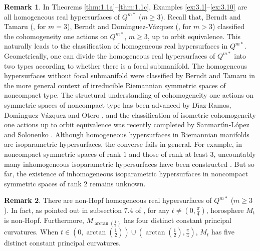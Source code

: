 \documentclass[reqno]{amsart}%
\theoremstyle{definition}
\newtheorem{remark}{Remark}[section]
\numberwithin{equation}{section}
\begin{document}
\begin{remark}\label{rem:1.1}
In Theorems \ref{thm:1.1a}--\ref{thm:1.1c}, Examples \ref{ex:3.1}--\ref{ex:3.10} are all homogeneous real hypersurfaces of $Q^{m*}$ ($m\geq3$). Recall that,
Berndt and Tamaru (\cite{BT2}, for $m=3$), Berndt and Dom\'{\i}nguez-V\'{a}zquez (\cite{BD1}, for $m>3$) classified the cohomogeneity one actions on 
$Q^{m*}$, $m\geq3$, up to orbit equivalence. This naturally leads to the classification of homogeneous real hypersurfaces in $Q^{m*}$. Geometrically,
one can divide the homogeneous real hypersurfaces of $Q^{m*}$ into two types
according to whether there is a focal submanifold. The homogeneous hypersurfaces without focal submanifold were classified by Berndt and Tamaru \cite{BT1} in the more general context of irreducible Riemannian symmetric
spaces of noncompact type. The structural understanding of 
cohomogeneity one actions on symmetric spaces of noncompact type 
has been advanced by D\'{\i}az-Ramos, Dom\'{\i}nguez-V\'{a}zquez and Otero \cite{DDO}, and the classification of isometric cohomogeneity one actions up to orbit equivalence was recently completed by Sanmart\'{\i}n-L\'{o}pez and Solonenko \cite{SS}. Although homogeneous hypersurfaces in Riemannian manifolds are isoparametric hypersurfaces, the converse fails in general. For example, in noncompact symmetric spaces of rank $1$ and those of rank at least $3$,
uncountably many inhomogeneous isoparametric hypersurfaces have been constructed \cite{DD2,DDR,DS}. But so far, the existence of 
inhomogeneous isoparametric hypersurfaces in noncompact symmetric spaces of rank $2$ remains unknown. 
\end{remark}

\begin{remark}\label{rem:1.1aaa}
There are non-Hopf homogeneous real hypersurfaces of $Q^{m*}$ ($m\geq3$).
In fact, as pointed out in subsection 7.4 of \cite{BS-2022}, for any $t\neq(0,\frac{\pi}{4})$, horosphere $M_t$ is non-Hopf. Furthermore, $M_{\arctan(\frac{1}{2})}$ has four distinct constant principal curvatures. When $t\in(0,\arctan(\frac{1}{2}))\cup(\arctan(\frac{1}{2}),\frac{\pi}{4})$, $M_t$ has five distinct constant principal curvatures.
\end{remark}
\end{document}
